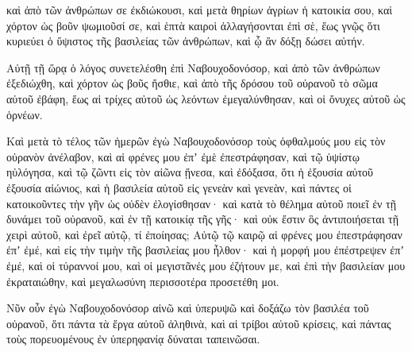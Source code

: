 {καὶ ἀπὸ τῶν ἀνθρώπων σε ἐκδιώκουσι, καὶ μετὰ θηρίων ἀγρίων ἡ κατοικία σου, καὶ χόρτον ὡς βοῦν ψωμιοῦσί σε, καὶ ἑπτὰ καιροὶ ἀλλαγήσονται ἐπὶ σὲ, ἕως γνῷς ὅτι κυριεύει ὁ ὕψιστος τῆς βασιλείας τῶν ἀνθρώπων, καὶ ᾧ ἂν δόξῃ δώσει αὐτήν.
\par }{\PP {}Αὐτῇ τῇ ὥρᾳ ὁ λόγος συνετελέσθη ἐπὶ Ναβουχοδονόσορ, καὶ ἀπὸ τῶν ἀνθρώπων ἐξεδιώχθη, καὶ χόρτον ὡς βοῦς ἤσθιε, καὶ ἀπὸ τῆς δρόσου τοῦ οὐρανοῦ τὸ σῶμα αὐτοῦ ἐβάφη, ἕως αἱ τρίχες αὐτοῦ ὡς λεόντων ἐμεγαλύνθησαν, καὶ οἱ ὄνυχες αὐτοῦ ὡς ὁρνέων.
\par }{\PP {}Καὶ μετὰ τὸ τέλος τῶν ἡμερῶν ἐγὼ Ναβουχοδονόσορ τοὺς ὀφθαλμούς μου εἰς τὸν οὐρανὸν ἀνέλαβον, καὶ αἱ φρένες μου ἐπʼ ἐμὲ ἐπεστράφησαν, καὶ τῷ ὑψίστῳ ηὐλόγησα, καὶ τῷ ζῶντι εἰς τὸν αἰῶνα ᾔνεσα, καὶ ἐδόξασα, ὅτι ἡ ἐξουσία αὐτοῦ ἐξουσία αἰώνιος, καὶ ἡ βασιλεία αὐτοῦ εἰς γενεὰν καὶ γενεὰν,
καὶ πάντες οἱ κατοικοῦντες τὴν γῆν ὡς οὐδὲν ἐλογίσθησαν· καὶ κατὰ τὸ θέλημα αὐτοῦ ποιεῖ ἐν τῇ δυνάμει τοῦ οὐρανοῦ, καὶ ἐν τῇ κατοικίᾳ τῆς γῆς· καὶ οὐκ ἔστιν ὃς ἀντιποιήσεται τῇ χειρὶ αὐτοῦ, καὶ ἐρεῖ αὐτῷ, τί ἐποίησας;
Αὐτῷ τῷ καιρῷ αἱ φρένες μου ἐπεστράφησαν ἐπʼ ἐμέ, καὶ εἰς τὴν τιμὴν τῆς βασιλείας μου ἦλθον· καὶ ἡ μορφή μου ἐπέστρεψεν ἐπʼ ἐμέ, καὶ οἱ τύραννοί μου, καὶ οἱ μεγιστᾶνές μου ἐζήτουν με, καὶ ἐπὶ τὴν βασιλείαν μου ἐκραταιώθην, καὶ μεγαλωσύνη περισσοτέρα προσετέθη μοι.
\par }{\PP {}Νῦν οὖν ἐγὼ Ναβουχοδονόσορ αἰνῶ καὶ ὑπερυψῶ καὶ δοξάζω τὸν βασιλέα τοῦ οὐρανοῦ, ὅτι πάντα τὰ ἔργα αὐτοῦ ἀληθινὰ, καὶ αἱ τρίβοι αὐτοῦ κρίσεις, καὶ πάντας τοὺς πορευομένους ἐν ὑπερηφανίᾳ δύναται ταπεινῶσαι.

}
